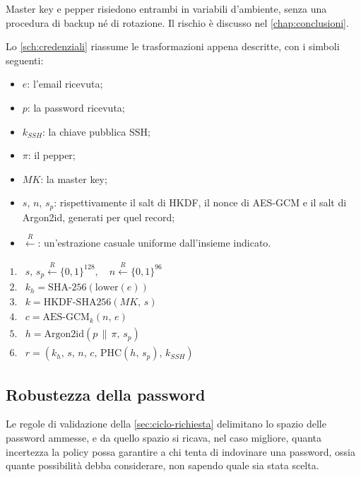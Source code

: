 Master key e pepper risiedono entrambi in variabili d'ambiente, senza una procedura di backup né di
rotazione. Il rischio è discusso nel \autoref{chap:conclusioni}.


Lo \autoref{sch:credenziali} riassume le trasformazioni appena descritte, con i simboli seguenti:

\begin{itemize}
    \item $e$: l'email ricevuta;
    \item $p$: la password ricevuta;
    \item $k_{SSH}$: la chiave pubblica SSH;
    \item $\pi$: il pepper;
    \item $MK$: la master key;
    \item $s$, $n$, $s_p$: rispettivamente il salt di HKDF, il nonce di AES-GCM e il salt di
    Argon2id, generati per quel record;
    \item $\stackrel{R}{\leftarrow}$: un'estrazione casuale uniforme dall'insieme indicato.
\end{itemize}

\begin{schema}
\centering
$\begin{array}{rl}
1. & s,\, s_p \stackrel{R}{\leftarrow} \{0,1\}^{128}, \quad n \stackrel{R}{\leftarrow} \{0,1\}^{96} \\[4pt]
2. & k_h = \mathrm{SHA\mbox{-}256}(\mathrm{lower}(e)) \\[4pt]
3. & k = \mathrm{HKDF\mbox{-}SHA256}(MK,\, s) \\[4pt]
4. & c = \mathrm{AES\mbox{-}GCM}_{k}(n,\, e) \\[4pt]
5. & h = \mathrm{Argon2id}(p \, \| \, \pi,\, s_p) \\[4pt]
6. & r = (k_h,\, s,\, n,\, c,\, \mathrm{PHC}(h,\, s_p),\, k_{SSH})
\end{array}$
\caption{Trasformazioni applicate alle credenziali prima della scrittura del record.}
\label{sch:credenziali}
\end{schema}

\subsection{Robustezza della password}
\label{sec:entropia}

Le regole di validazione della \autoref{sec:ciclo-richiesta} delimitano lo spazio delle password
ammesse, e da quello spazio si ricava, nel caso migliore, quanta incertezza la policy possa
garantire a chi tenta di indovinare una password, ossia quante possibilità debba considerare, non
sapendo quale sia stata scelta.

